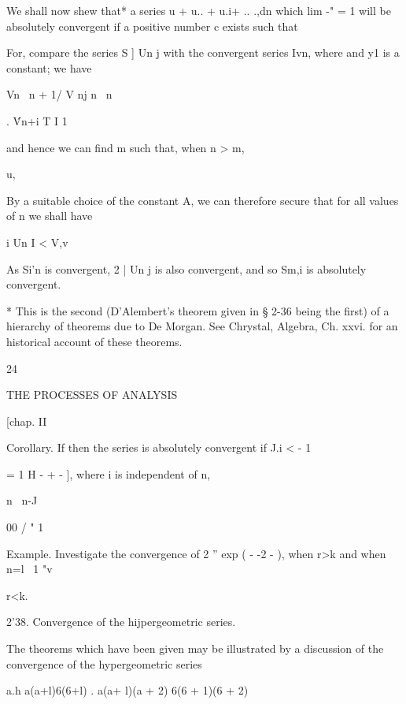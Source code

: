 We shall now shew that* a series u + u.. + u.i+ .. .,dn which lim -" =
1 will be absolutely convergent if a positive number c exists such
that

For, compare the series S ] Un j with the convergent series Ivn, where
and y1 is a constant; we have



Vn \ n + 1/ V nj n \ n

. \'Vn+i T I 1

and hence we can find m such that, when n > m,



u,






By a suitable choice of the constant A, we can therefore secure that
for all values of n we shall have

i Un I < V,v

As Si'n is convergent, 2 | Un j is also convergent, and so Sm,i is
absolutely convergent.

* This is the second (D'Alembert's theorem given in § 2-36 being the
first) of a hierarchy of theorems due to De Morgan. See Chrystal,
Algebra, Ch. xxvi. for an historical account of these theorems.



24



THE PROCESSES OF ANALYSIS



[chap. II






Corollary. If then the series is absolutely convergent if J.i < - 1



= 1 H - + - ], where i is independent of n,

n \ n-J



00 / " 1 \

Example. Investigate the convergence of 2 '' exp ( - -2 - ), when r>k
and when n=l \ 1 "v



r<k.

2'38. Convergence of the hijpergeometric series.

The theorems which have been given may be illustrated by a discussion
of the convergence of the hypergeometric series

  a.h a(a+l)6(6+l) . a(a+ l)(a + 2) 6(6 + 1)(6 + 2)

